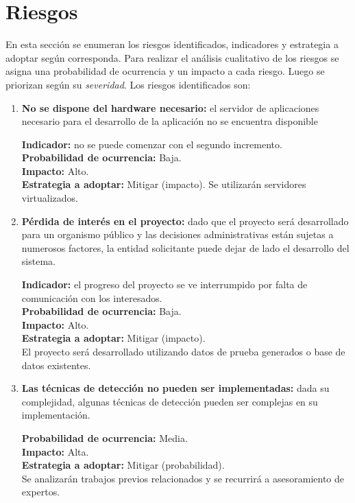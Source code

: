 \section*{Riesgos}

En esta sección se enumeran los riesgos identificados, indicadores y estrategia a adoptar según corresponda. Para realizar el análisis cualitativo de los riesgos se asigna una probabilidad de ocurrencia y un impacto a cada riesgo. Luego se priorizan según su \textit{severidad}. Los riesgos identificados son:

\begin{enumerate}
\item \textbf{No se dispone del hardware necesario:} el servidor de aplicaciones necesario para el desarrollo de la aplicación no se encuentra disponible

\textbf{Indicador:} no se puede comenzar con el segundo incremento. \\
\textbf{Probabilidad de ocurrencia:} Baja. \\
\textbf{Impacto:} Alto. \\
\textbf{Estrategia a adoptar:} Mitigar (impacto).
Se utilizarán servidores virtualizados.

\newpage

\item \textbf{Pérdida de interés en el proyecto:} dado que el proyecto será desarrollado para un organismo público y las decisiones administrativas están sujetas a numerosos factores, la entidad solicitante puede dejar de lado el desarrollo del sistema.

\textbf{Indicador:} el progreso del proyecto se ve interrumpido por falta de comunicación con los interesados. \\
\textbf{Probabilidad de ocurrencia:} Baja. \\
\textbf{Impacto:} Alto. \\
\textbf{Estrategia a adoptar:} Mitigar (impacto). \\
El proyecto será desarrollado utilizando datos de prueba generados o base de datos existentes.

\item \textbf{Las técnicas de detección no pueden ser implementadas:} dada su complejidad, algunas técnicas de detección pueden ser complejas en su implementación.

\textbf{Probabilidad de ocurrencia:} Media. \\
\textbf{Impacto:} Alta. \\
\textbf{Estrategia a adoptar:} Mitigar (probabilidad). \\
Se analizarán trabajos previos relacionados y se recurrirá a asesoramiento de expertos.

\end{enumerate}

